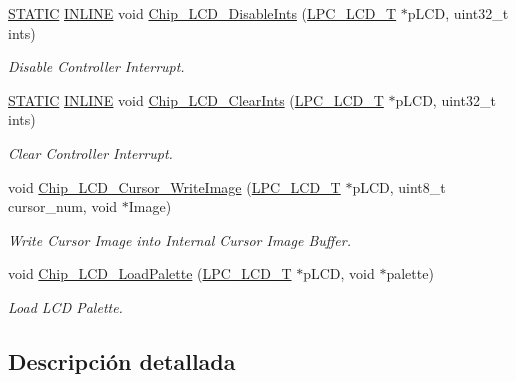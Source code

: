 \begin{DoxyCompactItemize}
\hyperlink{group___l_p_c___types___public___macros_ga10b2d890d871e1489bb02b7e70d9bdfb}{S\+T\+A\+T\+IC} \hyperlink{spifi__18xx__43xx_8h_a2eb6f9e0395b47b8d5e3eeae4fe0c116}{I\+N\+L\+I\+NE} void \hyperlink{group___l_c_d__18_x_x__43_x_x_ga98d2df2f7630bce1ca9e6af19f8c8426}{Chip\+\_\+\+L\+C\+D\+\_\+\+Disable\+Ints} (\hyperlink{struct_l_p_c___l_c_d___t}{L\+P\+C\+\_\+\+L\+C\+D\+\_\+T} $\ast$p\+L\+CD, uint32\+\_\+t ints)
\begin{DoxyCompactList}\small\item\em Disable Controller Interrupt. \end{DoxyCompactList}\item 
\hyperlink{group___l_p_c___types___public___macros_ga10b2d890d871e1489bb02b7e70d9bdfb}{S\+T\+A\+T\+IC} \hyperlink{spifi__18xx__43xx_8h_a2eb6f9e0395b47b8d5e3eeae4fe0c116}{I\+N\+L\+I\+NE} void \hyperlink{group___l_c_d__18_x_x__43_x_x_ga895dd5e12a15f0a30ab17054747ce9f7}{Chip\+\_\+\+L\+C\+D\+\_\+\+Clear\+Ints} (\hyperlink{struct_l_p_c___l_c_d___t}{L\+P\+C\+\_\+\+L\+C\+D\+\_\+T} $\ast$p\+L\+CD, uint32\+\_\+t ints)
\begin{DoxyCompactList}\small\item\em Clear Controller Interrupt. \end{DoxyCompactList}\item 
void \hyperlink{group___l_c_d__18_x_x__43_x_x_ga51c750babdecc5a01beff92f32b431af}{Chip\+\_\+\+L\+C\+D\+\_\+\+Cursor\+\_\+\+Write\+Image} (\hyperlink{struct_l_p_c___l_c_d___t}{L\+P\+C\+\_\+\+L\+C\+D\+\_\+T} $\ast$p\+L\+CD, uint8\+\_\+t cursor\+\_\+num, void $\ast$Image)
\begin{DoxyCompactList}\small\item\em Write Cursor Image into Internal Cursor Image Buffer. \end{DoxyCompactList}\item 
void \hyperlink{group___l_c_d__18_x_x__43_x_x_gaca363a0ae6e47d7bba4d0c51b99b0c8a}{Chip\+\_\+\+L\+C\+D\+\_\+\+Load\+Palette} (\hyperlink{struct_l_p_c___l_c_d___t}{L\+P\+C\+\_\+\+L\+C\+D\+\_\+T} $\ast$p\+L\+CD, void $\ast$palette)
\begin{DoxyCompactList}\small\item\em Load L\+CD Palette. \end{DoxyCompactList}\end{DoxyCompactItemize}


\subsection{Descripción detallada}


